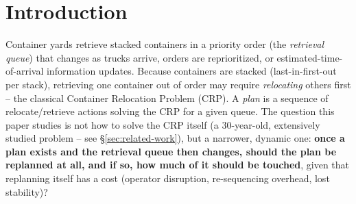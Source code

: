 \documentclass[11pt]{article}
\begin{document}
\begin{abstract}
enough in magnitude to begin with, a precondition distinct from, though
related to, the timing guarantees Propositions 1--3 establish once such a
pair exists). Twelve real implementation bugs (eight from the initial
build, four more from self-review, \S\ref{sec:limitations}) were caught
and fixed directly from the suite's own output and are disclosed rather
than silently corrected. No directly competing named replanning-policy
baseline was found in the CRP-specific literature; we position the
contribution against the closest available theory (rolling-horizon
schedule freezing, smoothed online optimization, event-triggered control)
instead. The claim is therefore scoped precisely: the infrastructure is
correct but empirically ties standard policies on natural data; the
lookahead margin is where this report's real, validated -- both proved
and measured -- contribution lies.
\end{abstract}

\section{Introduction}
\label{sec:intro}

Container yards retrieve stacked containers in a priority order (the
\emph{retrieval queue}) that changes as trucks arrive, orders are
reprioritized, or estimated-time-of-arrival information updates. Because
containers are stacked (last-in-first-out per stack), retrieving one
container out of order may require \emph{relocating} others first -- the
classical Container Relocation Problem (CRP). A \emph{plan} is a sequence
of relocate/retrieve actions solving the CRP for a given queue. The
question this paper studies is not how to solve the CRP itself (a
30-year-old, extensively studied problem -- see \S\ref{sec:related-work}),
but a narrower, dynamic one: \textbf{once a plan exists and the retrieval
queue then changes, should the plan be replanned at all, and if so, how
much of it should be touched}, given that replanning itself has a cost
(operator disruption, re-sequencing overhead, lost stability)?
\end{document}
